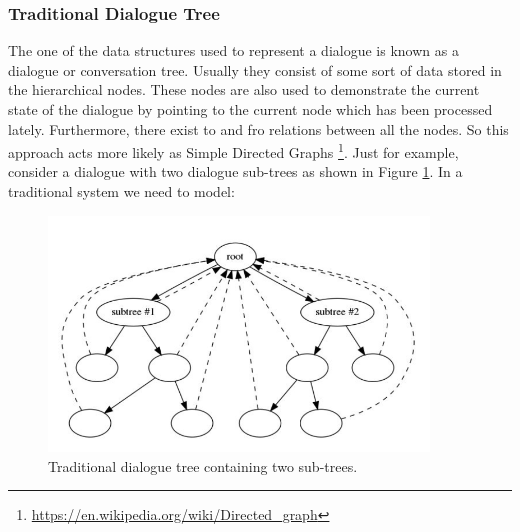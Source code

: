 \subsubsection*{Traditional Dialogue Tree}
The one of the data structures used to represent a dialogue is known as a dialogue or conversation tree. Usually they consist of some sort of data stored in the hierarchical nodes. These nodes are also used to demonstrate the current state of the dialogue by pointing to the current node which has been processed lately. Furthermore, there exist to and fro relations between all the nodes. So this approach acts more likely as Simple Directed Graphs \footnote{\url{https://en.wikipedia.org/wiki/Directed\_graph}}. Just for example, consider a dialogue with two dialogue sub-trees as shown in Figure \ref{fig:modArch}. In a traditional system we need to model:

\begin{figure}[!h]
    \centering
    \includegraphics[width=0.9\textwidth]{img/Modular_Architecture.PNG}
    \caption{Traditional dialogue tree containing two sub-trees.}
    \label{fig:modArch}
\end{figure}


